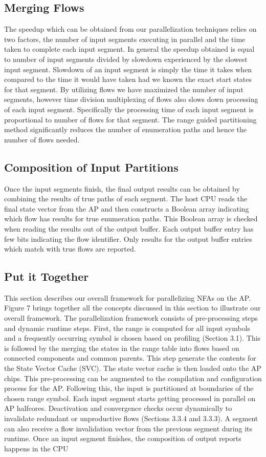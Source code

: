 \subsection{Merging Flows}
The speedup which can be obtained from our parallelization techniques relies on two factors, the number of input segments executing
in parallel and the time taken to complete each input segment. In
general the speedup obtained is equal to number of input segments
divided by slowdown experienced by the slowest input segment.
Slowdown of an input segment is simply the time it takes when
compared to the time it would have taken had we known the exact
start states for that segment.
By utilizing flows we have maximized the number of input segments, however time division multiplexing of flows also slows down
processing of each input segment. Specifically the processing time
of each input segment is proportional to number of flows for that
segment. The range guided partitioning method significantly reduces
the number of enumeration paths and hence the number of flows
needed.

\subsection{Composition of Input Partitions}
Once the input segments finish, the final output results can be obtained by combining the results of true paths of each segment. The
host CPU reads the final state vector from the AP and then constructs a Boolean array indicating which flow has results for true
enumeration paths. This Boolean array is checked when reading the
results out of the output buffer. Each output buffer entry has few
bits indicating the flow identifier. Only results for the output buffer
entries which match with true flows are reported.

\subsection{Put it Together}
This section describes our overall framework for parallelizing NFAs
on the AP. Figure 7 brings together all the concepts discussed in this
section to illustrate our overall framework. The parallelization framework consists of pre-processing steps and dynamic runtime steps.
First, the range is computed for all input symbols and a frequently
occurring symbol is chosen based on profiling (Section 3.1). This
is followed by the merging the states in the range table into flows
based on connected components and common parents.
This step generate the contents for the
State Vector Cache (SVC). The state vector cache is then loaded
onto the AP chips. This pre-processing can be augmented to the
compilation and configuration process for the AP. Following this,
the input is partitioned at boundaries of the chosen range symbol.
Each input segment starts getting processed in parallel on AP halfcores. Deactivation and convergence checks occur dynamically to
invalidate redundant or unproductive flows (Sections 3.3.4 and 3.3.3).
A segment can also receive a flow invalidation vector from the previous segment during its runtime. Once an input segment finishes, the
composition of output reports happens in the CPU 
